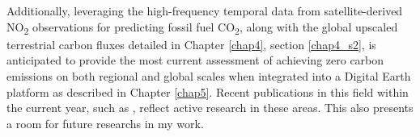 Additionally, leveraging the high-frequency temporal data from satellite-derived NO\textsubscript{2} observations for predicting fossil fuel CO\textsubscript{2}, along with the global upscaled terrestrial carbon fluxes detailed in Chapter \ref{chap4}, section \ref{chap4_s2}, is anticipated to provide the most current assessment of achieving zero carbon emissions on both regional and global scales when integrated into a Digital Earth platform as described in Chapter \ref{chap5}. Recent publications in this field within the current year, such as \citep{zhang2023quantifying, yang2023using, miyazaki2023predictability}, reflect active research in these areas. This also presents a room for future researchs in my work.\par
